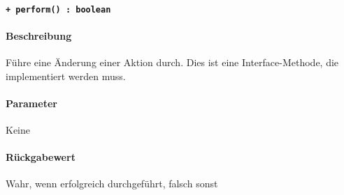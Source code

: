\paragraph{\texttt{+ perform() : boolean}}\label{AP_Change_perform}%
\paragraph*{Beschreibung}
Führe eine Änderung einer Aktion durch.
Dies ist eine Interface-Methode, die implementiert werden muss.
\paragraph*{Parameter}
Keine
\paragraph*{Rückgabewert}
Wahr, wenn erfolgreich durchgeführt, falsch sonst
